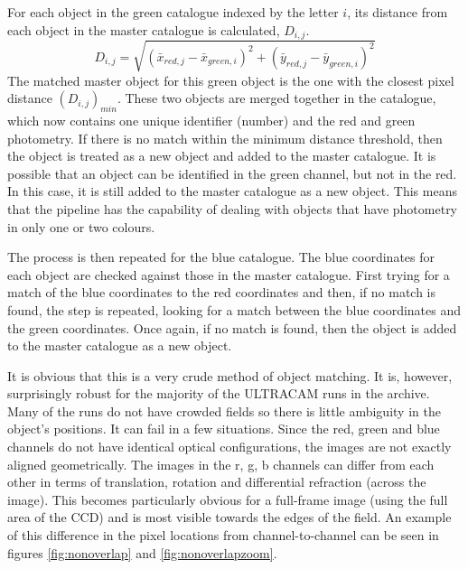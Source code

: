 For each object in the green catalogue indexed by the letter $i$, its distance from each object in the master catalogue is calculated, $D_{i,j}$. 
\begin{equation}D_{i,j} = \sqrt{(\bar{x}_{red, j}-\bar{x}_{green, i})^2 + (\bar{y}_{red, j}-\bar{y}_{green, i})^2}\end{equation} 
The matched master object for this green object is the one with the closest pixel distance $(D_{i,j})_{min}$. These two objects are merged together in the catalogue, which now contains one unique identifier (number) and the red and green photometry. If there is no match within the minimum distance threshold, then the object is treated as a new object and added to the master catalogue. It is possible that an object can be identified in the green channel, but not in the red. In this case, it is still added to the master catalogue as a new object. This means that the pipeline has the capability of dealing with objects that have photometry in only one or two colours. 

The process is then repeated for the blue catalogue. The blue coordinates for each object are checked against those in the master catalogue. First trying for a match of the blue coordinates to the red coordinates and then, if no match is found, the step is repeated, looking for a match between the blue coordinates and the green coordinates. Once again, if no match is found, then the object is added to the master catalogue as a new object.  

It is obvious that this is a very crude method of object matching. It is, however, surprisingly robust for the majority of the ULTRACAM runs in the archive. Many of the runs do not have crowded fields so there is little ambiguity in the object's positions. It can fail in a few situations. Since the red, green and blue channels do not have identical optical configurations, the images are not exactly aligned geometrically. The images in the r, g, b channels can differ from each other in terms of translation, rotation and differential refraction (across the image). This becomes particularly obvious for a full-frame image (using the full area of the CCD) and is most visible towards the edges of the field. An example of this difference in the pixel locations from channel-to-channel can be seen in figures \ref{fig:nonoverlap} and \ref{fig:nonoverlapzoom}.

